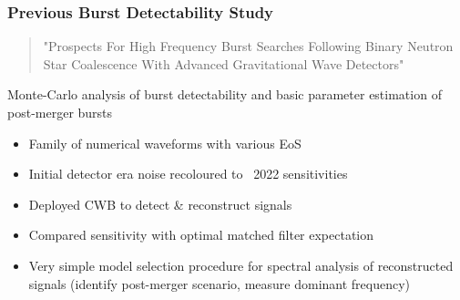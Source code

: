 \documentclass[serif,mathserif,10pt]{beamer}
\let\oldframetitle\frametitle%
\renewcommand{\frametitle}[1]{%
      \oldframetitle{#1}\setstretch{1.2}}
\begin{document}
\begin{frame}
\begin{columns}
    \end{columns}

\end{frame}

\begin{frame}
    \frametitle{Previous Burst Detectability Study}
    \begin{quote}
        "Prospects For High Frequency Burst Searches Following Binary Neutron
        Star Coalescence With Advanced Gravitational Wave
        Detectors"~\cite{2014PhRvD..90f2004C}
    \end{quote}

    Monte-Carlo analysis of burst detectability and basic parameter estimation
    of post-merger bursts
    \begin{itemize}
        \item Family of numerical waveforms with various EoS
        \item Initial detector era noise recoloured to ~2022 sensitivities
        \item Deployed CWB to detect \& reconstruct signals
        \item Compared sensitivity with optimal matched filter expectation
        \item Very simple model selection procedure for spectral analysis of
            reconstructed signals (identify post-merger scenario, measure
            dominant frequency)
    \end{itemize}

\end{frame}
\end{document}
